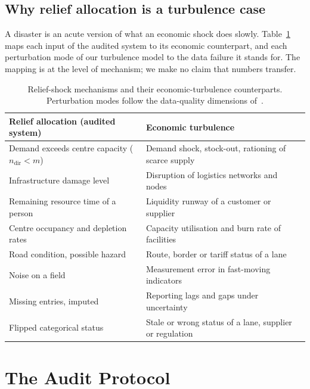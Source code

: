 \documentclass[systems,article,submit,moreauthors,pdftex]{Definitions/mdpi}
\begin{document}
\subsection{Why relief allocation is a turbulence case}
A disaster is an acute version of what an economic shock does slowly. Table~\ref{tab:mapping}
maps each input of the audited system to its economic counterpart, and each perturbation
mode of our turbulence model to the data failure it stands for. The mapping is at the level
of mechanism; we make no claim that numbers transfer.

\begin{table}[H]
\centering
\caption{Relief-shock mechanisms and their economic-turbulence counterparts. Perturbation
modes follow the data-quality dimensions of~\cite{wang1996dataquality}.\label{tab:mapping}}
\small
\begin{tabularx}{\textwidth}{>{\raggedright\arraybackslash}X>{\raggedright\arraybackslash}X}
\toprule
Relief allocation (audited system) & Economic turbulence\\
\midrule
Demand exceeds centre capacity ($n_{\mathrm{dir}} < m$) & Demand shock, stock-out, rationing of scarce supply\\
Infrastructure damage level & Disruption of logistics networks and nodes~\cite{ivanov2020viability}\\
Remaining resource time of a person & Liquidity runway of a customer or supplier\\
Centre occupancy and depletion rates & Capacity utilisation and burn rate of facilities\\
Road condition, possible hazard & Route, border or tariff status of a lane\\
\midrule
Noise on a field & Measurement error in fast-moving indicators\\
Missing entries, imputed & Reporting lags and gaps under uncertainty~\cite{bloom2009uncertainty,baker2016epu}\\
Flipped categorical status & Stale or wrong status of a lane, supplier or regulation\\
\bottomrule
\end{tabularx}
\end{table}

\section{The Audit Protocol}\label{sec:protocol}
\end{document}
